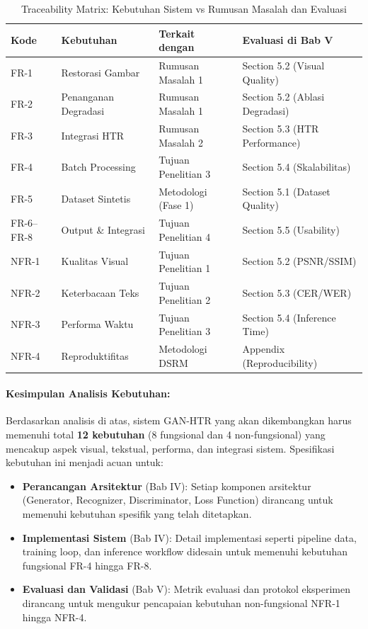 \begin{table}[htbp!]
\centering
\small
\caption{Traceability Matrix: Kebutuhan Sistem vs Rumusan Masalah dan Evaluasi}
\label{tab:traceability-matrix}
\begin{tabular}{p{}p{}p{}p{}}
\toprule
\textbf{Kode} & \textbf{Kebutuhan} & \textbf{Terkait dengan} & \textbf{Evaluasi di Bab V} \\
\midrule
FR-1 & Restorasi Gambar & Rumusan Masalah 1 & Section 5.2 (Visual Quality) \\
\midrule
FR-2 & Penanganan Degradasi & Rumusan Masalah 1 & Section 5.2 (Ablasi Degradasi) \\
\midrule
FR-3 & Integrasi HTR & Rumusan Masalah 2 & Section 5.3 (HTR Performance) \\
\midrule
FR-4 & Batch Processing & Tujuan Penelitian 3 & Section 5.4 (Skalabilitas) \\
\midrule
FR-5 & Dataset Sintetis & Metodologi (Fase 1) & Section 5.1 (Dataset Quality) \\
\midrule
FR-6--FR-8 & Output \& Integrasi & Tujuan Penelitian 4 & Section 5.5 (Usability) \\
\midrule
NFR-1 & Kualitas Visual & Tujuan Penelitian 1 & Section 5.2 (PSNR/SSIM) \\
\midrule
NFR-2 & Keterbacaan Teks & Tujuan Penelitian 2 & Section 5.3 (CER/WER) \\
\midrule
NFR-3 & Performa Waktu & Tujuan Penelitian 3 & Section 5.4 (Inference Time) \\
\midrule
NFR-4 & Reproduktifitas & Metodologi DSRM & Appendix (Reproducibility) \\
\bottomrule
\end{tabular}
\end{table}

\paragraph{Kesimpulan Analisis Kebutuhan:}

Berdasarkan analisis di atas, sistem GAN-HTR yang akan dikembangkan harus memenuhi total \textbf{12 kebutuhan} (8 fungsional dan 4 non-fungsional) yang mencakup aspek visual, tekstual, performa, dan integrasi sistem. Spesifikasi kebutuhan ini menjadi acuan untuk:

\begin{itemize}
    \item \textbf{Perancangan Arsitektur} (Bab IV): Setiap komponen arsitektur (Generator, Recognizer, Discriminator, Loss Function) dirancang untuk memenuhi kebutuhan spesifik yang telah ditetapkan.
    
    \item \textbf{Implementasi Sistem} (Bab IV): Detail implementasi seperti pipeline data, training loop, dan inference workflow didesain untuk memenuhi kebutuhan fungsional FR-4 hingga FR-8.
    
    \item \textbf{Evaluasi dan Validasi} (Bab V): Metrik evaluasi dan protokol eksperimen dirancang untuk mengukur pencapaian kebutuhan non-fungsional NFR-1 hingga NFR-4.
\end{itemize}

